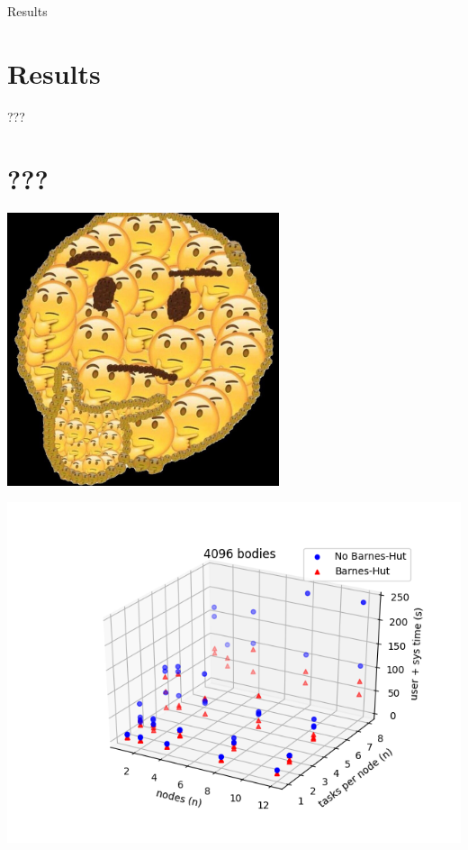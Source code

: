 \documentclass{beamer}
\begin{document}
\begin{frame}[allowframebreaks]{Results}
\section{Results}
\end{frame}

\begin{frame}[allowframebreaks]{???}
\section{???}

\includegraphics[width=8cm]{hmm}

\framebreak

\includegraphics[width=\linewidth]{4096-nodes-tasksPerNode}

\framebreak


\end{frame}
\end{document}
